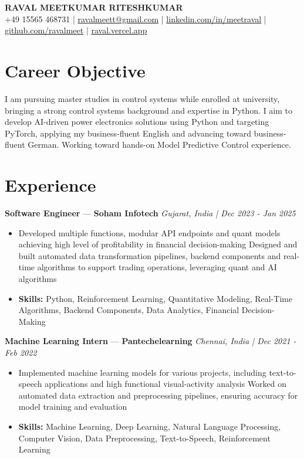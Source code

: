\documentclass[a4paper,10pt]{article}
\begin{document}
\begin{center}
  {\Large\bfseries RAVAL MEETKUMAR RITESHKUMAR}\\[2pt]
  {\small +49 15565 468731 \;|\; \href{mailto:ravalmeett@gmail.com}{ravalmeett@gmail.com} \;|\; \href{https://www.linkedin.com/in/meetraval/}{linkedin.com/in/meetraval} \;|\; \href{https://github.com/ravalmeet}{github.com/ravalmeet} \;|\; \href{https://raval.vercel.app/}{raval.vercel.app}}
\end{center}
\vspace{-3pt}

\section*{Career Objective}
I am pursuing master studies in control systems while enrolled at university, bringing a strong control systems background and expertise in Python. I aim to develop AI-driven power electronics solutions using Python and targeting PyTorch, applying my business-fluent English and advancing toward business-fluent German. Working toward hands-on Model Predictive Control experience.\par

\section*{Experience}
\textbf{Software Engineer} — \textbf{Soham Infotech} \hfill \textit{Gujarat, India \;|\; Dec 2023 - Jan 2025}\par
\vspace{1pt}
\begin{itemize}
  \item Developed multiple functions, modular API endpoints and quant models achieving high level of profitability in financial decision-making Designed and built automated data transformation pipelines, backend components and real-time algorithms to support trading operations, leveraging quant and AI algorithms
  \item \textbf{Skills:} Python, Reinforcement Learning, Quantitative Modeling, Real-Time Algorithms, Backend Components, Data Analytics, Financial Decision-Making
\end{itemize}
\vspace{3pt}
\textbf{Machine Learning Intern} — \textbf{Pantechelearning} \hfill \textit{Chennai, India \;|\; Dec 2021 - Feb 2022}\par
\vspace{1pt}
\begin{itemize}
  \item Implemented machine learning models for various projects, including text-to-speech applications and high functional visual-activity analysis Worked on automated data extraction and preprocessing pipelines, ensuring accuracy for model training and evaluation
  \item \textbf{Skills:} Machine Learning, Deep Learning, Natural Language Processing, Computer Vision, Data Preprocessing, Text-to-Speech, Reinforcement Learning
\end{itemize}
\end{document}
